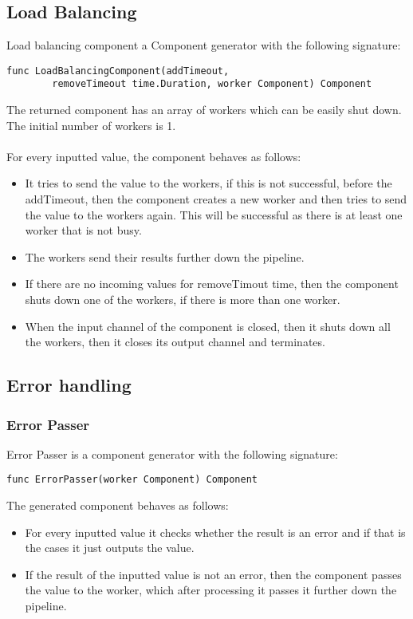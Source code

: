 \documentclass[12pt,a4paper]{article}
\begin{document}
\subsection{Load Balancing}
Load balancing component a Component generator with the following signature:
\begin{lstlisting}
func LoadBalancingComponent(addTimeout, 
		removeTimeout time.Duration, worker Component) Component
\end{lstlisting}
The returned component has an array of workers which can be easily shut down.
The initial number of workers is 1. 
\\
\\
For every inputted value, the component behaves as follows:
\begin{itemize}
	\item It tries to send the value to the workers, if this is not successful, 
				before the addTimeout, then the component creates a new worker and then
				tries to send the value to the workers again. This will be successful as
				there is at least one worker that is not busy.
	\item The workers send their results further down the pipeline.
	\item If there are no incoming values for removeTimout time, then the component
				shuts down one of the workers, if there is more than one worker.
	\item When the input channel of the component is closed, then it shuts down all
				the workers, then it closes its output channel and terminates.

\end{itemize}

\subsection{Error handling}
\subsubsection{Error Passer}
Error Passer is a component generator with the following signature:

\begin{lstlisting}
func ErrorPasser(worker Component) Component
\end{lstlisting}
The generated component behaves as follows:
\begin{itemize}
	\item For every inputted value it checks whether the result is an error
				and if that is the cases it just outputs the value.
	\item If the result of the inputted value is not an error, then the component
				passes the value to the worker, which after processing it passes 
				it further down the pipeline.
\end{itemize}
\end{document}
